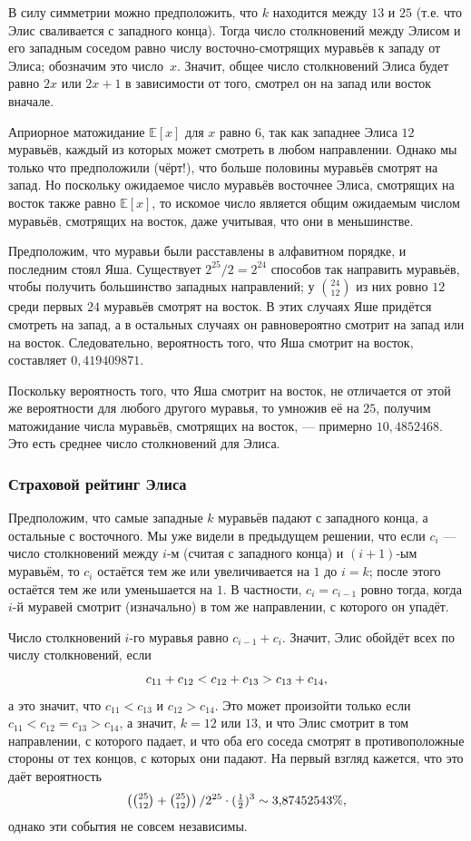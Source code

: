 В силу симметрии можно предположить, что $k$ находится между $13$ и $25$ (т.е. что Элис сваливается с западного конца).
Тогда число столкновений между Элисом и его западным соседом равно числу восточно-смотрящих муравьёв к западу от Элиса; обозначим это число~$x$.
Значит, общее число столкновений Элиса будет равно $2x$ или $2x+1$ в зависимости от того, смотрел он на запад или восток вначале.

Априорное матожидание $\mathbb{E}[x]$ для $x$ равно $6$, так как западнее Элиса $12$ муравьёв, каждый из которых может смотреть в любом направлении.
Однако мы только что предположили (чёрт!), что больше половины муравьёв смотрят на запад.
Но поскольку ожидаемое число муравьёв восточнее Элиса, смотрящих на восток также равно $\mathbb{E}[x]$, то искомое число является общим ожидаемым числом муравьёв, смотрящих на восток, даже учитывая, что они в меньшинстве.

Предположим, что муравьи были расставлены в алфавитном порядке, и последним стоял Яша.
Существует $2^{25}/2=2^{24}$ способов так направить муравьёв, чтобы получить большинство западных направлений; у $\binom{24}{12}$
из них ровно $12$ среди первых $24$ муравьёв смотрят на восток.
В этих случаях Яше придётся смотреть на запад,
а в остальных случаях он равновероятно смотрит на запад или на восток.
Следовательно, вероятность того, что Яша смотрит на восток, составляет
$0{,}419409871$.

Поскольку вероятность того, что Яша смотрит на восток, не отличается от этой же вероятности для любого другого муравья, то умножив её на $25$, получим матожидание числа муравьёв, смотрящих на восток, --- примерно $10{,}4852468$.
Это  есть среднее число столкновений для Элиса.

\subsubsection*{Страховой рейтинг Элиса}

Предположим, что самые западные $k$ муравьёв падают с западного конца,
а остальные с восточного.
Мы уже видели в предыдущем решении, что если $c_i$ --- число столкновений между $i$-м (считая с западного конца) и $(i + 1)$-ым муравьём, то $c_i$ остаётся тем же или увеличивается на $1$ до $i = k$; после этого остаётся тем же или уменьшается на $1$.
В частности, $c_i=c_{i-1}$ ровно тогда, когда $i$-й муравей смотрит (изначально) в том же направлении, с которого он упадёт.

Число столкновений $i$-го муравья равно $c_{i-1}+c_{i}$.
Значит, Элис обойдёт всех по числу столкновений, если 
\[c_{11}+c_{12}\z<c_{12}\z+c_{13}\z>c_{13}\z+c_{14},\]
а это значит, что  $c_{11}<c_{13}$ и $c_{12}>c_{14}$.
Это может произойти только если 
$c_{11}<c_{12}=c_{13}>c_{14}$,
а значит,  $k = 12$ или $13$, и что Элис смотрит в том направлении, с которого падает,
и что оба его соседа смотрят в противоположные стороны от тех концов, с которых они падают.
На первый взгляд кажется, что это даёт вероятность 
\[\left(\tbinom{25}{12}+\tbinom{25}{12}\right)/2^{25}\cdot (\tfrac12)^3\sim 3{,}87452543\%,\]
однако эти события не совсем независимы.

